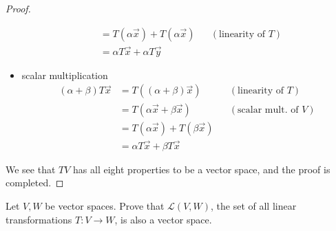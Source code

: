 \begin{proof}
\begin{itemize}
\begin{align*}
        &=T(\alpha\vec{x})+T(\alpha\vec{x}) && (\text{linearity of $T$})\\
        &=\alpha T\vec{x}+\alpha T\vec{y}
      \end{align*}
    \item scalar multiplication
      \begin{align*}
        (\alpha+\beta)T\vec{x}
        &=T((\alpha+\beta)\vec{x}) && (\text{linearity of $T$})\\
        &=T(\alpha\vec{x}+\beta\vec{x}) && (\text{scalar mult. of $V$})\\
        &=T(\alpha\vec{x})+T(\beta\vec{x}) \\
        &=\alpha T\vec{x}+\beta T\vec{x}
      \end{align*}
  \end{itemize}
  We see that $TV$ has all eight properties to be a vector space, and the proof
  is completed.


\end{proof}
\begin{homework}
  Let $V,W$ be vector spaces. Prove that $\mathcal{L}(V,W)$, the set of all 
  linear transformations $T:V\to W$, is also a vector space.
\end{homework}

